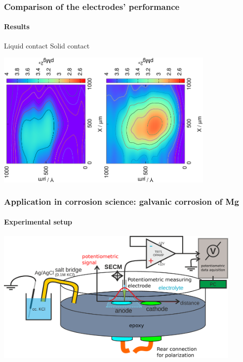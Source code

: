 \documentclass{beamer}
\begin{document}
\begin{frame}
	\frametitle{Comparison of the electrodes' performance} 
	\framesubtitle{Results}
	\centering
	\quad\quad\quad\quad Liquid contact \hfill Solid contact \quad\quad\quad\quad\quad

	\includegraphics[trim = 10mm 30mm 0mm 20mm, clip, width=0.4\textwidth, angle=-90]{liquid_Mg.eps}\hfill\includegraphics[trim = 10mm 30mm 0mm 20mm, clip, width=0.4\textwidth, angle=-90]{solid_Mg.eps}
\end{frame}

\begin{frame}
\frametitle{Application in corrosion science: galvanic corrosion of Mg}
\framesubtitle{Experimental setup}
\begin{center}
\includegraphics[width=0.9\textwidth]{model.eps}
\end{center}
\end{frame}
\end{document}
